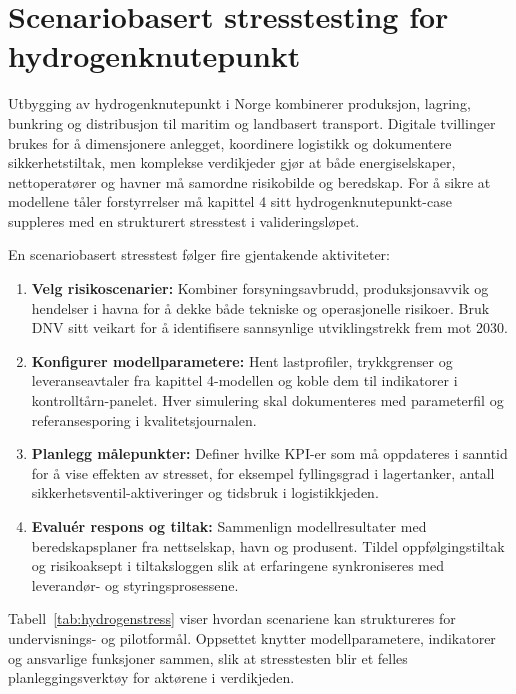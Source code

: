 \section{Scenariobasert stresstesting for hydrogenknutepunkt}
Utbygging av hydrogenknutepunkt i Norge kombinerer produksjon, lagring, bunkring og distribusjon til maritim og landbasert transport.\citep{enova2024hydrogenknutepunkt} Digitale tvillinger brukes for å dimensjonere anlegget, koordinere logistikk og dokumentere sikkerhetstiltak, men komplekse verdikjeder gjør at både energiselskaper, nettoperatører og havner må samordne risikobilde og beredskap.\citep{gassco2023hydrogen,dnv2023hydrogenforecast} For å sikre at modellene tåler forstyrrelser må kapittel 4 sitt hydrogenknutepunkt-case suppleres med en strukturert stresstest i valideringsløpet.

En scenariobasert stresstest følger fire gjentakende aktiviteter:
\begin{enumerate}
    \item \textbf{Velg risikoscenarier:} Kombiner forsyningsavbrudd, produksjonsavvik og hendelser i havna for å dekke både tekniske og operasjonelle risikoer. Bruk DNV sitt veikart for å identifisere sannsynlige utviklingstrekk frem mot 2030.\citep{dnv2023hydrogenforecast}
    \item \textbf{Konfigurer modellparametere:} Hent lastprofiler, trykkgrenser og leveranseavtaler fra kapittel 4-modellen og koble dem til indikatorer i kontrolltårn-panelet. Hver simulering skal dokumenteres med parameterfil og referansesporing i kvalitetsjournalen.
    \item \textbf{Planlegg målepunkter:} Definer hvilke KPI-er som må oppdateres i sanntid for å vise effekten av stresset, for eksempel fyllingsgrad i lagertanker, antall sikkerhetsventil-aktiveringer og tidsbruk i logistikkjeden.
    \item \textbf{Evaluér respons og tiltak:} Sammenlign modellresultater med beredskapsplaner fra nettselskap, havn og produsent. Tildel oppfølgingstiltak og risikoaksept i tiltaksloggen slik at erfaringene synkroniseres med leverandør- og styringsprosessene.
\end{enumerate}

Tabell~\ref{tab:hydrogenstress} viser hvordan scenariene kan struktureres for undervisnings- og pilotformål. Oppsettet knytter modellparametere, indikatorer og ansvarlige funksjoner sammen, slik at stresstesten blir et felles planleggingsverktøy for aktørene i verdikjeden.

